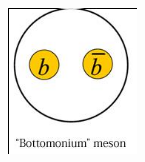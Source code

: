 \documentclass[mathserif, 10pt,usenames,dvipsnames]{beamer}
\begin{document}
\begin{frame}
\begin{columns}[c]
\begin{center}
            \includegraphics[scale=0.35]{btm.png}
        \end{center}
    \end{columns}
\end{frame}
\end{document}
